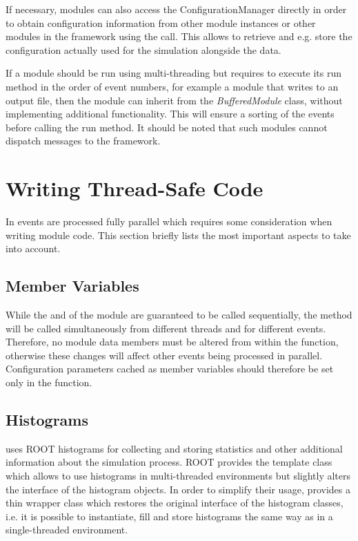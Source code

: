 If necessary, modules can also access the ConfigurationManager directly in order to obtain configuration information from other module instances or other modules in the framework using the  call.
This allows to retrieve and e.g. store the configuration actually used for the simulation alongside the data.

If a module should be run using multi-threading but requires to execute its run method in the order of event numbers, for example a module that writes to an output file, then the module can inherit from the \textit{BufferedModule} class, without implementing additional functionality.
This will ensure a sorting of the events before calling the run method.
It should be noted that such modules cannot dispatch messages to the framework.


\section{Writing Thread-Safe Code}
\label{sec:module_multithreading}

In \apsq events are processed fully parallel which requires some consideration when writing module code.
This section briefly lists the most important aspects to take into account.

\subsection{Member Variables}
\label{sec:multithreading_members}

While the  and  of the module are guaranteed to be called sequentially, the  method will be called simultaneously from different threads and for different events.
Therefore, no module data members must be altered from within the  function, otherwise these changes will affect other events being processed in parallel.
Configuration parameters cached as member variables should therefore be set only in the  function.

\subsection{Histograms}

\apsq uses ROOT histograms for collecting and storing statistics and other additional information about the simulation process.
ROOT provides the template class  which allows to use histograms in multi-threaded environments but slightly alters the interface of the histogram objects.
In order to simplify their usage, \apsq provides a thin wrapper class which restores the original interface of the histogram classes, i.e. it is possible to instantiate, fill and store histograms the same way as in a single-threaded environment.


